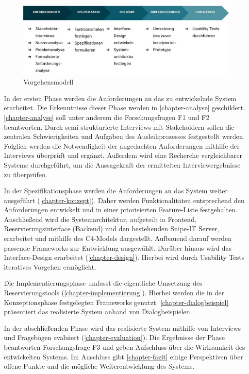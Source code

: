 \begin{figure}[h]
  \centering
  \includegraphics[scale=0.35]{Bilder/vorgehen.png}
  \caption{Vorgehensmodell}
  \label{fig:vorgehen}
\end{figure}

In der ersten Phase werden die Anforderungen an das zu entwickelnde System
erarbeitet. Die Erkenntnisse dieser Phase werden in \ref{chapter-analyse}
geschildert. \ref{chapter-analyse} soll unter anderem die Forschungsfragen F1
und F2 beantworten. Durch semi-strukturierte Interviews mit Stakeholdern sollen
die zentralen Schwierigkeiten und Aufgaben des Ausleihprozesses festgestellt
werden. Folglich werden die Notwendigkeit der angedachten Anforderungen mithilfe
der Interviews überprüft und ergänzt. Außerdem wird eine Recherche
vergleichbarer Systeme durchgeführt, um die Aussagekraft der ermittelten
Interviewergebnisse zu überprüfen.

In der Spezifikationsphase werden die Anforderungen an das System weiter
ausgeführt (\ref{chapter-konzept}). Daher werden Funktionalitäten
entsprechend den Anforderungen entwickelt und in einer priorisierten
Feature-Liste festgehalten. Anschließend wird die Systemarchitektur, aufgeteilt
in Frontend, Reservierungsinterface (Backend) und den bestehenden Snipe-IT
Server, erarbeitet und mithilfe des C4-Models dargestellt. Aufbauend darauf
werden passende Frameworks zur Entwicklung ausgewählt. Darüber hinaus wird das
Interface-Design erarbeitet (\ref{chapter-design}). Hierbei wird durch Usability
Tests iteratives Vorgehen ermöglicht.


Die Implementierungsphase umfasst die eigentliche Umsetzung des
Reservierungstools (\ref{chapter-implementierung}). Hierbei werden die in der
Konzeptionsphase festgelegten Frameworks genutzt. \ref{chapter-dialogbeispiel}
präsentiert das realisierte System anhand von Dialogbeispielen.

In der abschließenden Phase wird das realisierte System mithilfe von Interviews
und Fragebögen evaluiert (\ref{chapter-evaluation}). Die Ergebnisse der Phase
beantworten Forschungsfrage F3 und geben Aufschluss über die Wirksamkeit des
entwickelten Systems. Im Anschluss gibt \ref{chapter-fazit} einige Perspektiven
über offene Punkte und die mögliche Weiterentwicklung des Systems.